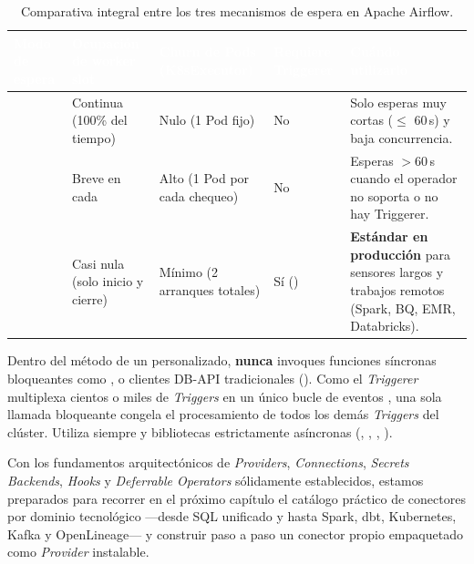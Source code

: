 \begin{table}[htbp]
\centering
\caption{Comparativa integral entre los tres mecanismos de espera en Apache Airflow.}
\label{tab:modos-espera}
\small
\begin{tabularx}{\textwidth}{@{}L{2.8cm} C{2.3cm} C{2.5cm} C{2.6cm} Y@{}}
\toprule
{}
\textcolor{white}{\sffamily\bfseries Modo de espera} &
\textcolor{white}{\sffamily\bfseries Ocupación de worker slot} &
\textcolor{white}{\sffamily\bfseries Churn de Pods (K8sExecutor)} &
\textcolor{white}{\sffamily\bfseries Requiere Triggerer} &
\textcolor{white}{\sffamily\bfseries Cuándo utilizarlo} \\
\midrule
\textbf{} & Continua (100\% del tiempo) & Nulo (1 Pod fijo) & \nomark{} No & Solo esperas muy cortas ($\le$ 60\,s) y baja concurrencia. \\
\textbf{} & Breve en cada  & Alto (1 Pod por cada chequeo) & \nomark{} No & Esperas $> 60$\,s cuando el operador no soporta  o no hay Triggerer. \\
\textbf{} & Casi nula (solo inicio y cierre) & Mínimo (2 arranques totales) & \yesmark{} Sí () & \textbf{Estándar en producción} para sensores largos y trabajos remotos (Spark, BQ, EMR, Databricks). \\
\bottomrule
\end{tabularx}
\end{table}

\begin{warningbox}
Dentro del método  de un  personalizado, \textbf{nunca} invoques funciones síncronas bloqueantes como ,  o clientes DB-API tradicionales (). Como el \textit{Triggerer} multiplexa cientos o miles de \textit{Triggers} en un único bucle de eventos , una sola llamada bloqueante congela el procesamiento de todos los demás \textit{Triggers} del clúster. Utiliza siempre  y bibliotecas estrictamente asíncronas (, , , ).
\end{warningbox}

Con los fundamentos arquitectónicos de \textit{Providers}, \textit{Connections}, \textit{Secrets Backends}, \textit{Hooks} y \textit{Deferrable Operators} sólidamente establecidos, estamos preparados para recorrer en el próximo capítulo el catálogo práctico de conectores por dominio tecnológico ---desde SQL unificado y  hasta Spark, dbt, Kubernetes, Kafka y OpenLineage--- y construir paso a paso un conector propio empaquetado como \textit{Provider} instalable.
